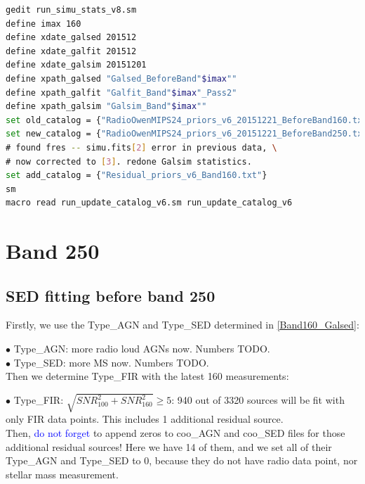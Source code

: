 \documentclass[11pt,a4paper]{article}
\begin{document}
\begin{lstlisting}[language=bash]
gedit run_simu_stats_v8.sm
define imax 160
define xdate_galsed 201512
define xdate_galfit 201512
define xdate_galsim 20151201
define xpath_galsed "Galsed_BeforeBand"$imax""
define xpath_galfit "Galfit_Band"$imax"_Pass2"
define xpath_galsim "Galsim_Band"$imax""
set old_catalog = {"RadioOwenMIPS24_priors_v6_20151221_BeforeBand160.txt"}
set new_catalog = {"RadioOwenMIPS24_priors_v6_20151221_BeforeBand250.txt"} \
# found fres -- simu.fits[2] error in previous data, \
# now corrected to [3]. redone Galsim statistics. 
set add_catalog = {"Residual_priors_v6_Band160.txt"}
sm
macro read run_update_catalog_v6.sm run_update_catalog_v6
\end{lstlisting}


\clearpage

\section{Band 250}

\subsection{SED fitting before band 250}
\label{Band250_Galsed}

Firstly, we use the Type\_AGN and Type\_SED determined in \ref{Band160_Galsed}:

\indent\hspace{15pt}$\bullet$ 
Type\_AGN: more radio loud AGNs now. Numbers TODO. 
\\
\indent\hspace{15pt}$\bullet$ 
Type\_SED: more MS now. Numbers TODO. 
\\

Then we determine Type\_FIR with the latest 160 measurements:

\indent\hspace{15pt}$\bullet$ 
Type\_FIR: $\sqrt{SNR_{100}^2+SNR_{160}^2} \ge 5$: 940 out of 3320 sources will be fit with only FIR data points. This includes 1 additional residual source. 
\\

Then, \textcolor{blue}{do not forget} to append zeros to coo\_AGN and coo\_SED files for those additional residual sources! Here we have 14 of them, and we set all of their Type\_AGN and Type\_SED to 0, because they do not have radio data point, nor stellar mass measurement. 
\end{document}
